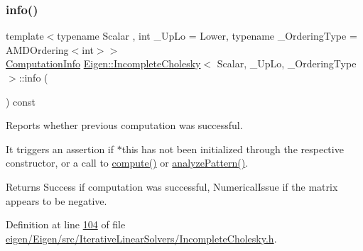\subsubsection{\texorpdfstring{info()}{info()}\hspace{0.1cm}{\footnotesize\ttfamily [1/2]}}
{\footnotesize\ttfamily template$<$typename Scalar , int \+\_\+\+Up\+Lo = Lower, typename \+\_\+\+Ordering\+Type  = A\+M\+D\+Ordering$<$int$>$$>$ \\
\hyperlink{group__enums_ga85fad7b87587764e5cf6b513a9e0ee5e}{Computation\+Info} \hyperlink{class_eigen_1_1_incomplete_cholesky}{Eigen\+::\+Incomplete\+Cholesky}$<$ Scalar, \+\_\+\+Up\+Lo, \+\_\+\+Ordering\+Type $>$\+::info (\begin{DoxyParamCaption}{ }\end{DoxyParamCaption}) const\hspace{0.3cm}{\ttfamily [inline]}}



Reports whether previous computation was successful. 

It triggers an assertion if {\ttfamily $\ast$this} has not been initialized through the respective constructor, or a call to \hyperlink{class_eigen_1_1_incomplete_cholesky_a7966bedeebbeaa7a8fe4dd1da3797a0b}{compute()} or \hyperlink{class_eigen_1_1_incomplete_cholesky_a702560ecdddef77dc51d20ab22bd974e}{analyze\+Pattern()}.

\begin{DoxyReturn}{Returns}
{\ttfamily Success} if computation was successful, {\ttfamily Numerical\+Issue} if the matrix appears to be negative. 
\end{DoxyReturn}


Definition at line \hyperlink{eigen_2_eigen_2src_2_iterative_linear_solvers_2_incomplete_cholesky_8h_source_l00104}{104} of file \hyperlink{eigen_2_eigen_2src_2_iterative_linear_solvers_2_incomplete_cholesky_8h_source}{eigen/\+Eigen/src/\+Iterative\+Linear\+Solvers/\+Incomplete\+Cholesky.\+h}.

\mbox{\label{class_eigen_1_1_incomplete_cholesky_ada0e68cb22601849464506f5986a88c1}} 
